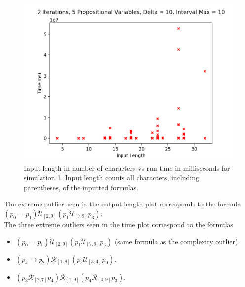 \documentclass[runningheads]{llncs}
\begin{document}
\begin{figure}[H]
    \centering
    \includegraphics[scale=0.75]{images/Sim1Time.png}
    \caption{Input length in number of characters vs run time in milliseconds for simulation 1. Input length counts all characters, including parentheses, of the inputted formulas.}
\end{figure}
\noindent The extreme outlier seen in the output length plot corresponds to the formula $(p_0 = p_1) \mathcal{U}_{[2,9]} (p_1 \mathcal{U}_{[7,9]} p_3)$.\\
The three extreme outliers seen in the time plot correspond to the formulas 
\begin{itemize}
    \item $(p_0 = p_1) \mathcal{U}_{[2,9]} (p_1 \mathcal{U}_{[7,9]} p_3)$ (same formula as the complexity outlier).
    \item $(p_4 \rightarrow p_2) \mathcal{R}_{[1,8]} (p_3 \mathcal{U}_{[3,4]} p_0)$.
    \item $(p_3 \mathcal{R}_{[2,7]} p_4) \mathcal{R}_{[1,9]} (p_4 \mathcal{R}_{[4,9]} p_3)$.
\end{itemize}
\end{document}
